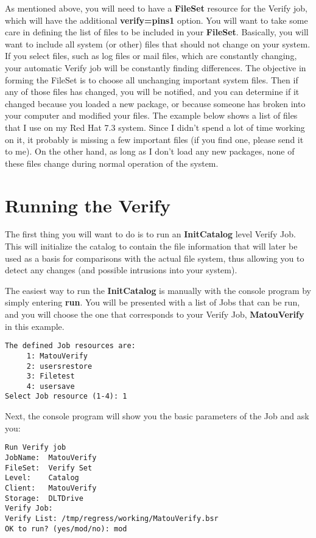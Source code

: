 As mentioned above, you will need to have a {\bf FileSet} resource for the
Verify job, which will have the additional {\bf verify=pins1} option. You will
want to take some care in defining the list of files to be included in your
{\bf FileSet}. Basically, you will want to include all system (or other) files
that should not change on your system. If you select files, such as log files
or mail files, which are constantly changing, your automatic Verify job will
be constantly finding differences. The objective in forming the FileSet is to
choose all unchanging important system files. Then if any of those files has
changed, you will be notified, and you can determine if it changed because you
loaded a new package, or because someone has broken into your computer and
modified your files. The example below shows a list of files that I use on my
Red Hat 7.3 system. Since I didn't spend a lot of time working on it, it
probably is missing a few important files (if you find one, please send it to
me). On the other hand, as long as I don't load any new packages, none of
these files change during normal operation of the system.

\section{Running the Verify}

The first thing you will want to do is to run an {\bf InitCatalog} level
Verify Job. This will initialize the catalog to contain the file information
that will later be used as a basis for comparisons with the actual file
system, thus allowing you to detect any changes (and possible intrusions into
your system).

The easiest way to run the {\bf InitCatalog} is manually with the console
program by simply entering {\bf run}. You will be presented with a list of
Jobs that can be run, and you will choose the one that corresponds to your
Verify Job, {\bf MatouVerify} in this example.

\footnotesize
\begin{verbatim}
The defined Job resources are:
     1: MatouVerify
     2: usersrestore
     3: Filetest
     4: usersave
Select Job resource (1-4): 1
\end{verbatim}
\normalsize

Next, the console program will show you the basic parameters of the Job and
ask you:

\footnotesize
\begin{verbatim}
Run Verify job
JobName:  MatouVerify
FileSet:  Verify Set
Level:    Catalog
Client:   MatouVerify
Storage:  DLTDrive
Verify Job:
Verify List: /tmp/regress/working/MatouVerify.bsr
OK to run? (yes/mod/no): mod
\end{verbatim}
\normalsize

